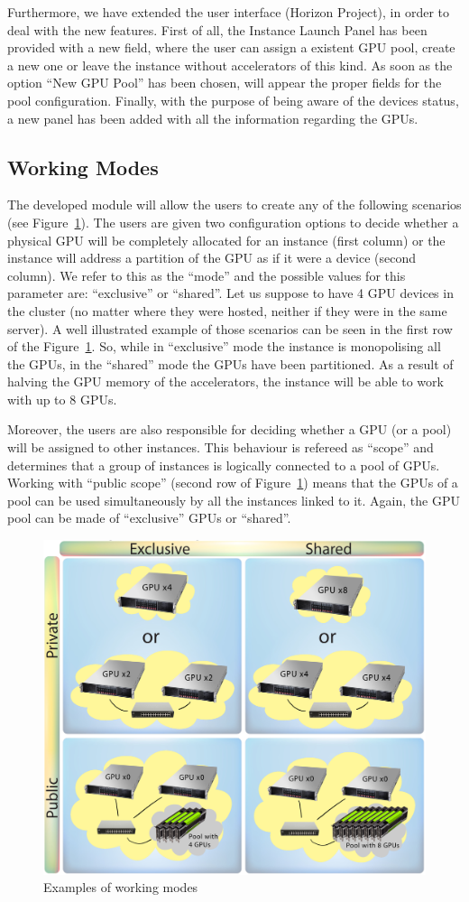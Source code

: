 \documentclass[a4paper,twoside]{article}
\begin{document}
Furthermore, we have extended the user interface (Horizon Project), in order to deal with the new features.
First of all, the Instance Launch Panel has been provided with a new field, where the user can assign a existent GPU pool, create a new one or leave the instance without accelerators of this kind.
As soon as the option ``New GPU Pool'' has been chosen, will appear the proper fields for the pool configuration.
Finally, with the purpose of being aware of the devices status, a new panel has been added with all the information regarding the GPUs.

\subsection{Working Modes}
The developed module will allow the users to create any of the following scenarios (see Figure~\ref{fig2}). 
The users are given two configuration options to decide whether a physical GPU will be completely allocated for an instance (first column) or the instance will address a partition of the GPU as if it were a device (second column).
We refer to this as the ``mode'' and the possible values for this parameter are: ``exclusive'' or ``shared''. 
Let us suppose to have 4 GPU devices in the cluster (no matter where they were hosted, neither if they were in the same server). 
A well illustrated example of those scenarios can be seen in the first row of the  Figure~\ref{fig2}.
So, while in ``exclusive'' mode the instance is monopolising all the GPUs, in the ``shared'' mode the GPUs have been partitioned. 
As a result of halving the GPU memory of the accelerators, the instance will be able to work with up to 8 GPUs.

Moreover, the users are also responsible for deciding whether a GPU (or a pool) will be assigned to other instances. 
This behaviour is refereed as ``scope'' and determines that a group of instances is logically connected to a pool of GPUs.
Working with ``public scope'' (second row of Figure~\ref{fig2}) means that the GPUs of a pool can be used simultaneously by all the instances linked to it.
Again, the GPU pool can be made of ``exclusive'' GPUs or ``shared''.

\begin{figure}[!t]
  \centering
  \includegraphics[width=.5\textwidth]{images/workingmodes.jpg}
  \caption{Examples of working modes}
  \label{fig2}
\end{figure}
\end{document}
